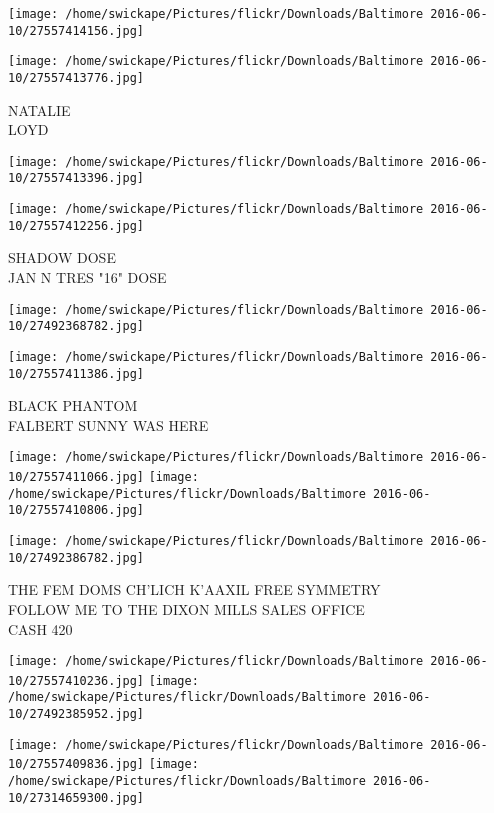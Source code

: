 \documentclass[10pt,letterpaper]{article}
\begin{document}
\texttt{[image: /home/swickape/Pictures/flickr/Downloads/Baltimore 2016-06-10/27557414156.jpg]}

\vspace{0.25in}
\texttt{[image: /home/swickape/Pictures/flickr/Downloads/Baltimore 2016-06-10/27557413776.jpg]}

NATALIE\\
LOYD
\pagebreak

\texttt{[image: /home/swickape/Pictures/flickr/Downloads/Baltimore 2016-06-10/27557413396.jpg]}

\vspace{0.25in}
\texttt{[image: /home/swickape/Pictures/flickr/Downloads/Baltimore 2016-06-10/27557412256.jpg]}

SHADOW DOSE\\
JAN N TRES "16" DOSE
\pagebreak

\texttt{[image: /home/swickape/Pictures/flickr/Downloads/Baltimore 2016-06-10/27492368782.jpg]}

\vspace{0.25in}
\texttt{[image: /home/swickape/Pictures/flickr/Downloads/Baltimore 2016-06-10/27557411386.jpg]}

BLACK PHANTOM\\
FALBERT SUNNY WAS HERE
\pagebreak

\texttt{[image: /home/swickape/Pictures/flickr/Downloads/Baltimore 2016-06-10/27557411066.jpg]}
\texttt{[image: /home/swickape/Pictures/flickr/Downloads/Baltimore 2016-06-10/27557410806.jpg]}

\vspace{0.25in}
\texttt{[image: /home/swickape/Pictures/flickr/Downloads/Baltimore 2016-06-10/27492386782.jpg]}

THE FEM DOMS CH'LICH K'AAXIL FREE SYMMETRY\\
FOLLOW ME TO THE DIXON MILLS SALES OFFICE\\
CASH 420
\pagebreak

\texttt{[image: /home/swickape/Pictures/flickr/Downloads/Baltimore 2016-06-10/27557410236.jpg]}
\texttt{[image: /home/swickape/Pictures/flickr/Downloads/Baltimore 2016-06-10/27492385952.jpg]}

\texttt{[image: /home/swickape/Pictures/flickr/Downloads/Baltimore 2016-06-10/27557409836.jpg]}
\texttt{[image: /home/swickape/Pictures/flickr/Downloads/Baltimore 2016-06-10/27314659300.jpg]}
\end{document}
